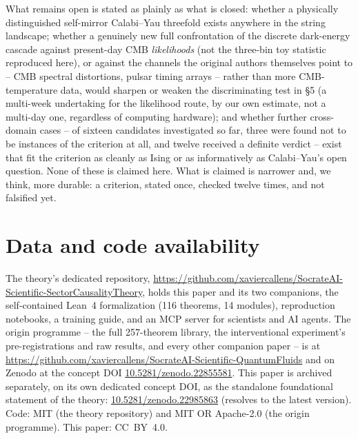 \documentclass[11pt,a4paper]{article}
\begin{document}
What remains open is stated as plainly as what is closed: whether a physically distinguished
self-mirror Calabi--Yau threefold exists anywhere in the string landscape; whether a genuinely new full
confrontation of the discrete dark-energy cascade against present-day CMB \emph{likelihoods} (not the
three-bin toy statistic reproduced here), or against the channels the original authors themselves point
to -- CMB spectral distortions, pulsar timing arrays -- rather than more CMB-temperature data, would
sharpen or weaken the discriminating test in \S5 (a multi-week undertaking for the likelihood route, by
our own estimate, not a multi-day one, regardless of computing hardware); and whether further
cross-domain cases -- of sixteen candidates investigated so far, three were found not to be instances of
the criterion at all, and twelve received a definite verdict -- exist that fit the criterion as cleanly
as Ising or as informatively as Calabi--Yau's open question. None of these is claimed here. What is
claimed is narrower and, we think, more durable: a criterion, stated once, checked twelve times, and
not falsified yet.

\section*{Data and code availability}
The theory's dedicated repository, \url{https://github.com/xaviercallens/SocrateAI-Scientific-SectorCausalityTheory},
holds this paper and its two companions, the self-contained Lean~4 formalization (116 theorems, 14
modules), reproduction notebooks, a training guide, and an MCP server for scientists and AI agents. The
origin programme -- the full 257-theorem library, the interventional experiment's pre-registrations and
raw results, and every other companion paper -- is at
\url{https://github.com/xaviercallens/SocrateAI-Scientific-QuantumFluids} and on Zenodo at the concept
DOI \href{https://doi.org/10.5281/zenodo.22855581}{10.5281/zenodo.22855581}. This paper is archived
separately, on its own dedicated concept DOI, as the standalone foundational statement of the theory:
\href{https://doi.org/10.5281/zenodo.22985863}{10.5281/zenodo.22985863} (resolves to the latest
version). Code: MIT (the theory repository) and MIT OR Apache-2.0 (the origin programme). This paper: CC~BY~4.0.



\end{document}
